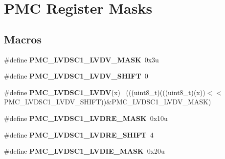 \hypertarget{group___p_m_c___register___masks}{}\section{P\+M\+C Register Masks}
\label{group___p_m_c___register___masks}
\subsection*{Macros}
\begin{DoxyCompactItemize}
\item 
\hypertarget{group___p_m_c___register___masks_ga777eada2a526d88569a30323e9d3e1d3}{}\#define {\bfseries P\+M\+C\+\_\+\+L\+V\+D\+S\+C1\+\_\+\+L\+V\+D\+V\+\_\+\+M\+A\+S\+K}~0x3u\label{group___p_m_c___register___masks_ga777eada2a526d88569a30323e9d3e1d3}

\item 
\hypertarget{group___p_m_c___register___masks_gaaf45daa6de387f93bc57f1218ab17a16}{}\#define {\bfseries P\+M\+C\+\_\+\+L\+V\+D\+S\+C1\+\_\+\+L\+V\+D\+V\+\_\+\+S\+H\+I\+F\+T}~0\label{group___p_m_c___register___masks_gaaf45daa6de387f93bc57f1218ab17a16}

\item 
\hypertarget{group___p_m_c___register___masks_gaa14e8452bdb4c61c57ed23eda94f715a}{}\#define {\bfseries P\+M\+C\+\_\+\+L\+V\+D\+S\+C1\+\_\+\+L\+V\+D\+V}(x)                                          ~(((uint8\+\_\+t)(((uint8\+\_\+t)(x))$<$$<$P\+M\+C\+\_\+\+L\+V\+D\+S\+C1\+\_\+\+L\+V\+D\+V\+\_\+\+S\+H\+I\+F\+T))\&P\+M\+C\+\_\+\+L\+V\+D\+S\+C1\+\_\+\+L\+V\+D\+V\+\_\+\+M\+A\+S\+K)\label{group___p_m_c___register___masks_gaa14e8452bdb4c61c57ed23eda94f715a}

\item 
\hypertarget{group___p_m_c___register___masks_gad771f87e373907e3ef60e5fa31001fad}{}\#define {\bfseries P\+M\+C\+\_\+\+L\+V\+D\+S\+C1\+\_\+\+L\+V\+D\+R\+E\+\_\+\+M\+A\+S\+K}~0x10u\label{group___p_m_c___register___masks_gad771f87e373907e3ef60e5fa31001fad}

\item 
\hypertarget{group___p_m_c___register___masks_ga056ca878a20782f5bf65b3be3e98581d}{}\#define {\bfseries P\+M\+C\+\_\+\+L\+V\+D\+S\+C1\+\_\+\+L\+V\+D\+R\+E\+\_\+\+S\+H\+I\+F\+T}~4\label{group___p_m_c___register___masks_ga056ca878a20782f5bf65b3be3e98581d}

\item 
\hypertarget{group___p_m_c___register___masks_ga1e7518c88ea0037d099124a643788363}{}\#define {\bfseries P\+M\+C\+\_\+\+L\+V\+D\+S\+C1\+\_\+\+L\+V\+D\+I\+E\+\_\+\+M\+A\+S\+K}~0x20u\label{group___p_m_c___register___masks_ga1e7518c88ea0037d099124a643788363}


\end{DoxyCompactItemize}
